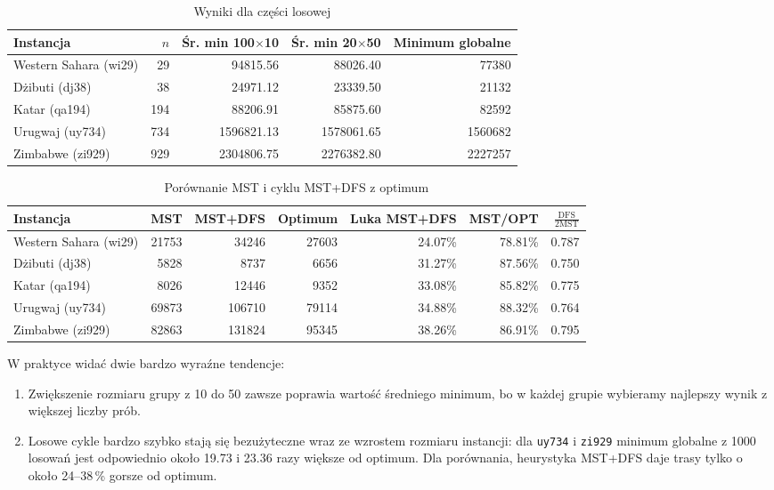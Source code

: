 \documentclass[12pt,a4paper]{article}
\begin{document}
\begin{table}[H]
\centering
\caption{Wyniki dla części losowej}
\label{tab:random}
\small
\begin{tabular}{@{}lrrrr@{}}
\toprule
Instancja & \(n\) & Śr. min 100$\times$10 & Śr. min 20$\times$50 & Minimum globalne \\ \midrule
Western Sahara (wi29) & 29 & \num{94815.56} & \num{88026.40} & \num{77380} \\
Dżibuti (dj38) & 38 & \num{24971.12} & \num{23339.50} & \num{21132} \\
Katar (qa194) & 194 & \num{88206.91} & \num{85875.60} & \num{82592} \\
Urugwaj (uy734) & 734 & \num{1596821.13} & \num{1578061.65} & \num{1560682} \\
Zimbabwe (zi929) & 929 & \num{2304806.75} & \num{2276382.80} & \num{2227257} \\
\bottomrule
\end{tabular}
\end{table}

\begin{table}[H]
\centering
\caption{Porównanie MST i cyklu MST+DFS z optimum}
\label{tab:mst}
\small
\begin{tabular}{@{}lrrrrrr@{}}
\toprule
Instancja & MST & MST+DFS & Optimum & Luka MST+DFS & MST/OPT & \(\frac{\mathrm{DFS}}{2\mathrm{MST}}\) \\ \midrule
Western Sahara (wi29) & \num{21753} & \num{34246} & \num{27603} & \num{24.07}\% & \num{78.81}\% & \num{0.787} \\
Dżibuti (dj38) & \num{5828} & \num{8737} & \num{6656} & \num{31.27}\% & \num{87.56}\% & \num{0.750} \\
Katar (qa194) & \num{8026} & \num{12446} & \num{9352} & \num{33.08}\% & \num{85.82}\% & \num{0.775} \\
Urugwaj (uy734) & \num{69873} & \num{106710} & \num{79114} & \num{34.88}\% & \num{88.32}\% & \num{0.764} \\
Zimbabwe (zi929) & \num{82863} & \num{131824} & \num{95345} & \num{38.26}\% & \num{86.91}\% & \num{0.795} \\
\bottomrule
\end{tabular}
\end{table}


W praktyce widać dwie bardzo wyraźne tendencje:
\begin{enumerate}
    \item Zwiększenie rozmiaru grupy z \num{10} do \num{50} zawsze poprawia wartość średniego minimum, bo
    w każdej grupie wybieramy najlepszy wynik z większej liczby prób.
    \item Losowe cykle bardzo szybko stają się bezużyteczne wraz ze wzrostem rozmiaru instancji:
    dla \texttt{uy734} i \texttt{zi929} minimum globalne z \num{1000} losowań jest odpowiednio około \num{19.73}
    i \num{23.36} razy większe od optimum. Dla porównania, heurystyka MST+DFS daje trasy tylko o około
    \num{24}--\num{38}\,\% gorsze od optimum.
\end{enumerate}
\end{document}
